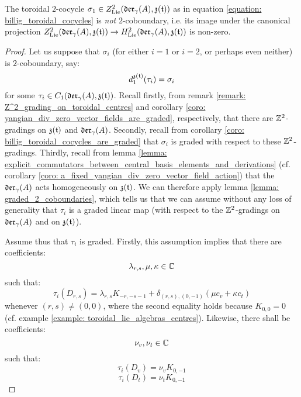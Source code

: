         \begin{proposition} \label{prop: sigma_1_is_not_coboundary}
            The toroidal $2$-cocycle $\sigma_1 \in Z^2_{\mathrm{Lie}}(\mathfrak{der}_{\gamma}(A), \mathfrak{z}(\mathfrak{t}) )$ as in equation \eqref{equation: billig_toroidal_cocycles} is \textit{not} $2$-coboundary, i.e. its image under the canonical projection $Z^2_{\mathrm{Lie}}(\mathfrak{der}_{\gamma}(A), \mathfrak{z}(\mathfrak{t}) ) \to H^2_{\mathrm{Lie}}(\mathfrak{der}_{\gamma}(A), \mathfrak{z}(\mathfrak{t}) )$ is non-zero.
        \end{proposition}
            \begin{proof}
                Let us suppose that $\sigma_i$ (for either $i = 1$ or $i = 2$, or perhaps even neither) is $2$-coboundary, say:
                    $$d_1^{\mathfrak{z}(\mathfrak{t})}(\tau_i) = \sigma_i$$
                for some $\tau_i \in C_1(\mathfrak{der}_{\gamma}(A), \mathfrak{z}(\mathfrak{t}))$. Recall firstly, from remark \ref{remark: Z^2_grading_on_toroidal_centres} and corollary \ref{coro: yangian_div_zero_vector_fields_are_graded}, respectively, that there are $\mathbb{Z}^2$-gradings on $\mathfrak{z}(\mathfrak{t})$ and $\mathfrak{der}_{\gamma}(A)$. Secondly, recall from corollary \ref{coro: billig_toroidal_cocycles_are_graded} that $\sigma_i$ is graded with respect to these $\mathbb{Z}^2$-gradings. Thirdly, recall from lemma \ref{lemma: explicit_commutators_between_central_basis_elements_and_derivations} (cf. corollary \ref{coro: a_fixed_yangian_div_zero_vector_field_action}) that the $\mathfrak{der}_{\gamma}(A)$ acts homogeneously on $\mathfrak{z}(\mathfrak{t})$. We can therefore apply lemma \ref{lemma: graded_2_coboundaries}, which tells us that we can assume without any loss of generality that $\tau_i$ is a graded linear map (with respect to the $\mathbb{Z}^2$-gradings on $\mathfrak{der}_{\gamma}(A)$ and on $\mathfrak{z}(\mathfrak{t})$).
            
                Assume thus that $\tau_i$ is graded. Firstly, this assumption  implies that there are coefficients:
                    $$\lambda_{r, s}, \mu, \kappa \in \mathbb{C}$$
                such that:
                    $$\tau_i(D_{r, s}) = \lambda_{r, s} K_{-r, -s - 1} + \delta_{(r, s), (0, -1)} ( \mu c_v + \kappa c_t )$$
                whenever $(r, s) \not = (0, 0)$, where the second equality holds because $K_{0, 0} = 0$ (cf. example \ref{example: toroidal_lie_algebras_centres}). Likewise, there shall be coefficients:
                    $$\nu_v, \nu_t \in \mathbb{C}$$
                such that:
                    $$\tau_i(D_v) = \nu_v K_{0, -1}$$
                    $$\tau_i(D_t) = \nu_t K_{0, -1}$$


\end{proof}
